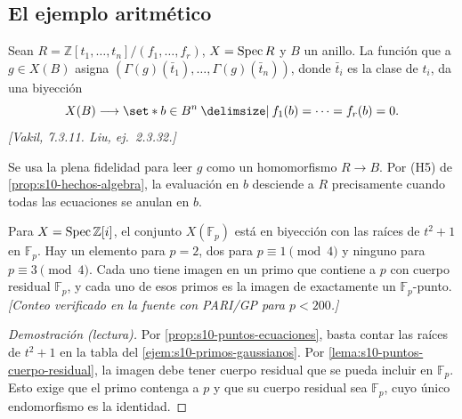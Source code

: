\subsection{El ejemplo aritmético}

\begin{prop}
\label{prop:s10-puntos-ecuaciones}
Sean \(R=\mathbb Z[t_1,\ldots,t_n]/(f_1,\ldots,f_r)\), \(X=\operatorname{Spec} R\) y \(B\) un anillo. La función que a \(g\in X(B)\) asigna \((\Gamma(g)(\bar t_1),\ldots,\Gamma(g)(\bar t_n))\), donde \(\bar t_i\) es la clase de \(t_i\), da una biyección
\[
 X(B)\longrightarrow\set*{b\in B^n\given f_1(b)=\cdots=f_r(b)=0}.
\]
\emph{[Vakil, 7.3.11. Liu, ej.~2.3.32.]}
\end{prop}
Se usa la plena fidelidad para leer \(g\) como un homomorfismo \(R\to B\). Por (H5) de \cref{prop:s10-hechos-algebra}, la evaluación en \(b\) desciende a \(R\) precisamente cuando todas las ecuaciones se anulan en \(b\).

\begin{prop}
\label{prop:s10-gaussianos-fp}
Para \(X=\operatorname{Spec}\mathbb Z[i]\), el conjunto \(X(\mathbb F_p)\) está en biyección con las raíces de \(t^2+1\) en \(\mathbb F_p\). Hay un elemento para \(p=2\), dos para \(p\equiv1\pmod 4\) y ninguno para \(p\equiv3\pmod 4\). Cada uno tiene imagen en un primo que contiene a \(p\) con cuerpo residual \(\mathbb F_p\), y cada uno de esos primos es la imagen de exactamente un \(\mathbb F_p\)-punto. \emph{[Conteo verificado en la fuente con PARI/GP para \(p<200\).]}
\end{prop}
\begin{proof}[Demostración (lectura)]
Por \cref{prop:s10-puntos-ecuaciones}, basta contar las raíces de \(t^2+1\) en la tabla del \cref{ejem:s10-primos-gaussianos}. Por \cref{lema:s10-puntos-cuerpo-residual}, la imagen debe tener cuerpo residual que se pueda incluir en \(\mathbb F_p\). Esto exige que el primo contenga a \(p\) y que su cuerpo residual sea \(\mathbb F_p\), cuyo único endomorfismo es la identidad.
\end{proof}

